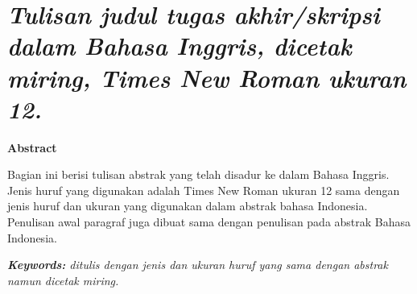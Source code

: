 \chapter*{\large \textit{Tulisan judul tugas akhir/skripsi dalam Bahasa Inggris, dicetak miring, Times New Roman ukuran 12.}}

\begin{center}
    \textbf{Abstract}
\end{center}
\begin{singlespace}
Bagian ini berisi tulisan abstrak yang telah disadur ke dalam Bahasa Inggris. Jenis huruf yang digunakan adalah Times New Roman ukuran 12 sama dengan jenis huruf dan ukuran yang digunakan dalam abstrak bahasa Indonesia. Penulisan awal paragraf juga dibuat sama dengan penulisan pada abstrak Bahasa Indonesia.

\vspace{0.5cm}
\noindent \textit{\textbf{Keywords:} ditulis dengan jenis dan ukuran huruf yang sama dengan abstrak namun dicetak miring.}
\end{singlespace}
